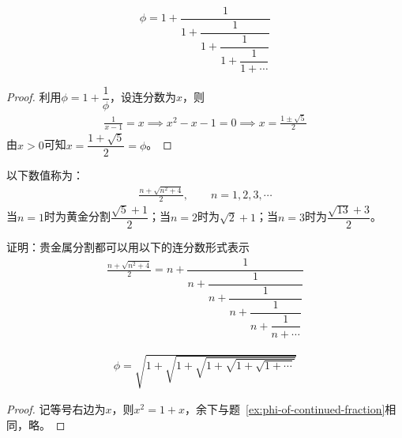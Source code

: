 \begin{example}[连分数表示]\label{ex:phi-of-continued-fraction}
  \begin{align}
    \phi = 1 + \dfrac1{1 + \dfrac1{1+\dfrac1{1+\dfrac1{1+\cdots}}}}
  \end{align}
\end{example}
\begin{proof}
  利用$\phi=1+\dfrac1\phi$，设连分数为$x$，则
  \begin{align*}
    \frac1{x-1}=x\implies x^2-x-1=0\implies x=\frac{1\pm\sqrt5}2
  \end{align*}
  由$x>0$可知$x=\dfrac{1+\sqrt5}2=\phi$。
\end{proof}

\begin{definition}
  以下数值称为：
  \begin{align}
    \frac{n+\sqrt{n^2+4}}2,\quad\quad n=1,2,3,\cdots
  \end{align}
  当$n=1$时为黄金分割$\dfrac{\sqrt5+1}2$；当$n=2$时为$\sqrt2+1$；当$n=3$时为$\dfrac{\sqrt{13}+3}2$。
\end{definition}
\begin{question}
  证明：贵金属分割都可以用以下的连分数形式表示
  \begin{align*}
    \frac{n+\sqrt{n^2+4}}2=
    n+\dfrac1{n+\dfrac1{n+\dfrac1{n+\dfrac1{n+\dfrac1{n+\cdots}}}}}
  \end{align*}
\end{question}

\begin{example}[平方根表示]
  \begin{align}
    \phi=\sqrt{1+\sqrt{1+\sqrt{1+\sqrt{1+\sqrt{1+\cdots}}}}}
  \end{align}
\end{example}
\begin{proof}
  记等号右边为$x$，则$x^2 = 1 + x$，余下与题~\ref{ex:phi-of-continued-fraction}相同，略。
\end{proof}

